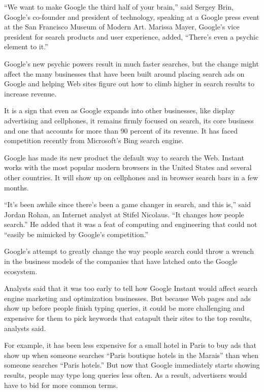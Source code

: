 ﻿\documentclass[12pt]{article}
\begin{document}
``We want to make Google the third half of your brain,'' said Sergey Brin, Google's co-founder and
president of technology, speaking at a Google press event at the San Francisco Museum of Modern Art.
Marissa Mayer, Google's vice president for search products and user experience, added, ``There's
even a psychic element to it.''

Google's new psychic powers result in much faster searches, but the change might affect the many
businesses that have been built around placing search ads on Google and helping Web sites figure out
how to climb higher in search results to increase revenue.

It is a sign that even as Google expands into other businesses, like display advertising and
cellphones, it remains firmly focused on search, its core business and one that accounts for more
than 90 percent of its revenue. It has faced competition recently from Microsoft's Bing search
engine.

Google has made its new product the default way to search the Web. Instant works with the most
popular modern browsers in the United States and several other countries. It will show up on
cellphones and in browser search bars in a few months.

``It's been awhile since there's been a game changer in search, and this is,'' said Jordan Rohan, an
Internet analyst at Stifel Nicolaus. ``It changes how people search.'' He added that it was a feat
of computing and engineering that could not ``easily be mimicked by Google's competition.''

Google's attempt to greatly change the way people search could throw a wrench in the business models
of the companies that have latched onto the Google ecosystem.

Analysts said that it was too early to tell how Google Instant would affect search engine marketing
and optimization businesses. But because Web pages and ads show up before people finish typing
queries, it could be more challenging and expensive for them to pick keywords that catapult their
sites to the top results, analysts said.

For example, it has been less expensive for a small hotel in Paris to buy ads that show up when
someone searches ``Paris boutique hotels in the Marais'' than when someone searches ``Paris
hotels.'' But now that Google immediately starts showing results, people may type long queries less
often. As a result, advertisers would have to bid for more common terms.
\end{document}
